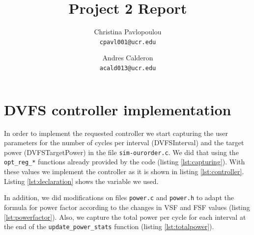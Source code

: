 \documentclass[10pt]{scrartcl}
\title{Project 2 Report}
\author{
   Christina Pavlopoulou\\
  \small \texttt{cpavl001@ucr.edu}
  \and
   Andres Calderon\\
  \small \texttt{acald013@ucr.edu}
}
\begin{document}
\maketitle

\section{DVFS controller implementation}
In order to implement the requested controller we start capturing the user parameters for the number of cycles per interval (DVFSInterval) and the target power (DVFSTargetPower) in the file \texttt{sim-ourorder.c}.  We did that using the \texttt{opt\_reg\_*} functions already provided by the code (listing \ref{lst:capturing}).  With these values we implement the controller as it is shown in listing \ref{lst:controller}.  Listing \ref{lst:declaration} shows the variable we used.

In addition, we did modifications on files \texttt{power.c} and \texttt{power.h} to adapt the formula for power factor according to the changes in VSF and FSF values (listing \ref{lst:powerfactor}).  Also, we capture the total power per cycle for each interval at the end of the \texttt{update\_power\_stats} function (listing \ref{lst:totalpower}).





\end{document}
